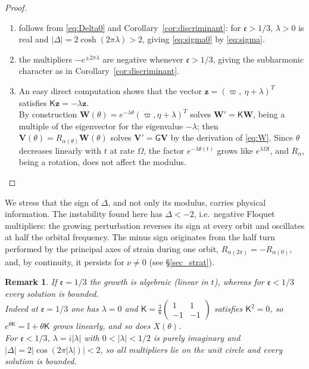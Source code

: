 \documentclass[reqno]{amsart}
\newcommand{\Msf}{\mathsf{G}}
\newcommand{\ee}{\mathfrak{e}}
\newtheorem{remark}[theorem]{Remark}
\begin{document}
\begin{proof}
\begin{enumerate}
    \item[(i)] follows from \eqref{eq:Delta0} and Corollary~\ref{cor:discriminant}: for $\ee>1/3$, $\lambda>0$ is real and $|\Delta|=2\cosh(2\pi\lambda)>2$, giving \eqref{eq:sigma0} by \eqref{eq:sigma}.
\item[(ii)] the multipliers $-e^{\pm2\pi\lambda}$ are negative whenever $\ee>1/3$, giving the subharmonic character as in Corollary~\ref{cor:discriminant}.
\item[(iii)] An easy direct computation shows that the vector $\mathbf{z}=(\varpi,\ \eta+\lambda)^T$ satisfies $\mathsf K\mathbf{z}=-\lambda\mathbf{z}$.\\
By construction $\mathbf W(\theta)=e^{-\lambda\theta}(\varpi,\eta+\lambda)^T$ solves $\mathbf W'=\mathsf K\mathbf W$, being a multiple of the eigenvector for the eigenvalue $-\lambda$; then $\mathbf V(\theta)=R_{\alpha(\theta)}\mathbf W(\theta)$ solves $\mathbf V'=\Msf\mathbf V$ by the derivation of \eqref{eq:W}. Since $\theta$ decreases linearly with $t$ at rate $\Omega$, the factor $e^{-\lambda\theta(t)}$ grows like $e^{\lambda\Omega t}$, and $R_\alpha$, being a rotation, does not affect the modulus.
\end{enumerate}
\end{proof}
We stress that the sign of $\Delta$, and not only its modulus, carries physical information. The instability found here has $\Delta<-2$, i.e.\ negative Floquet multipliers: the growing perturbation reverses its sign at every orbit and oscillates at half the orbital frequency. The minus sign originates from the half turn performed by the principal axes of strain during one orbit, $R_{\alpha(2\pi)}=-R_{\alpha(0)}$, and, by continuity, it persists for $\nu\neq0$ (see \S\ref{sec_strat}).
\begin{remark}
    If $\ee=1/3$ the growth is algebraic (linear in $t$), whereas for $\ee<1/3$ every solution is bounded.\\
    Indeed at $\ee=1/3$ one has $\lambda=0$ and $\mathsf K=\frac{3}{8}\left(\begin{smallmatrix}1&1\\-1&-1\end{smallmatrix}\right)$ satisfies $\mathsf K^2=0$, so $e^{\theta\mathsf K}=\mathbb I+\theta\mathsf K$ grows linearly, and so does $X(\theta)$. \\For $\ee<1/3$, $\lambda=i|\lambda|$ with $0<|\lambda|<1/2$ is purely imaginary and $|\Delta|=2|\cos(2\pi|\lambda|)|<2$, so all multipliers lie on the unit circle and every solution is bounded.     
\end{remark}
\end{document}
